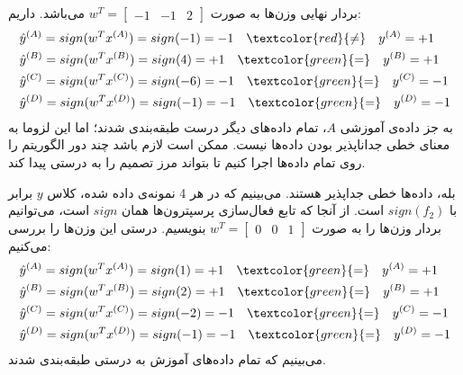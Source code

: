 \begin{ابجد}
\item بردار نهایی وزن‌ها به صورت $w^T = \begin{bmatrix} -1 & -1 & 2 \end{bmatrix}$ می‌باشد. داریم:
\begin{align*}
     & \hat{y}^{(A)} = sign(w^T x^{(A)}) = sign(-1) = -1 \quad \textcolor{red}{\neq} \quad y^{(A)} = +1 \\
     & \hat{y}^{(B)} = sign(w^T x^{(B)}) = sign(4) = +1 \quad  \textcolor{green}{=} \quad y^{(B)} = +1  \\
     & \hat{y}^{(C)} = sign(w^T x^{(C)}) = sign(-6) = -1 \quad \textcolor{green}{=} \quad y^{(C)} = -1  \\
     & \hat{y}^{(D)} = sign(w^T x^{(D)}) = sign(-1) = -1 \quad \textcolor{green}{=} \quad y^{(D)} = -1
\end{align*}
به جز داده‌ی آموزشی $A$، تمام داده‌های دیگر درست طبقه‌بندی شدند؛ اما این لزوما به معنای خطی جداناپذیر بودن داده‌ها نیست. ممکن است لازم باشد چند دور الگوریتم را روی تمام داده‌ها اجرا کنیم تا بتواند مرز تصمیم را به درستی پیدا کند.

\item بله، داده‌ها خطی جداپذیر هستند. می‌بینیم که در هر 4 نمونه‌ی داده شده، کلاس $y$ برابر با $sign(f_2)$ است. از آنجا که تابع فعال‌سازی پرسپترون‌ها همان $sign$ است، می‌توانیم بردار وزن‌ها را به صورت $w^T = \begin{bmatrix} 0 & 0 & 1 \end{bmatrix}$ بنویسیم. درستی این وزن‌ها را بررسی می‌کنیم:
\begin{align*}
     & \hat{y}^{(A)} = sign(w^T x^{(A)}) = sign(1) = +1 \quad \textcolor{green}{=} \quad y^{(A)} = +1  \\
     & \hat{y}^{(B)} = sign(w^T x^{(B)}) = sign(2) = +1 \quad  \textcolor{green}{=} \quad y^{(B)} = +1 \\
     & \hat{y}^{(C)} = sign(w^T x^{(C)}) = sign(-2) = -1 \quad \textcolor{green}{=} \quad y^{(C)} = -1 \\
     & \hat{y}^{(D)} = sign(w^T x^{(D)}) = sign(-1) = -1 \quad \textcolor{green}{=} \quad y^{(D)} = -1
\end{align*}
می‌بینیم که تمام داده‌های آموزش به درستی طبقه‌بندی شدند.

\end{ابجد}
